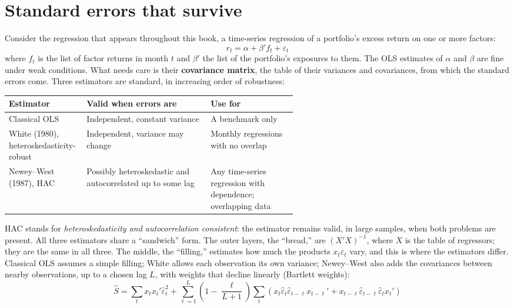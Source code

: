 \section{Standard errors that survive}
\label{sec:03-se}

Consider the regression that appears throughout this book, a time-series regression of a portfolio's excess return on one or more factors:
\begin{equation}
  r_t = \alpha + \beta' f_t + \varepsilon_t
  \label{eq:03-ts}
\end{equation}
where $f_t$ is the list of factor returns in month $t$ and $\beta'$ the list of the portfolio's exposures to them. The OLS estimates of $\alpha$ and $\beta$ are fine under weak conditions. What needs care is their \textbf{covariance matrix}, the table of their variances and covariances, from which the standard errors come. Three estimators are standard, in increasing order of robustness:

\begin{center}
\small
\begin{tabularx}{0.9\linewidth}{@{}>{\raggedright\arraybackslash}p{0.27\linewidth}>{\raggedright\arraybackslash}X>{\raggedright\arraybackslash}p{0.30\linewidth}@{}}
\toprule
Estimator & Valid when errors are & Use for \\
\midrule
Classical OLS & Independent, constant variance & A benchmark only \\
White (1980), heteroskedasticity-robust & Independent, variance may change & Monthly regressions with no overlap \\
Newey--West (1987), HAC & Possibly heteroskedastic and autocorrelated up to some lag & Any time-series regression with dependence; overlapping data \\
\bottomrule
\end{tabularx}
\end{center}

HAC stands for \emph{heteroskedasticity and autocorrelation consistent}: the estimator remains valid, in large samples, when both problems are present. All three estimators share a ``sandwich'' form. The outer layers, the ``bread,'' are $(X'X)^{-1}$, where $X$ is the table of regressors; they are the same in all three. The middle, the ``filling,'' estimates how much the products $x_t\varepsilon_t$ vary, and this is where the estimators differ. Classical OLS assumes a simple filling; White allows each observation its own variance; Newey--West also adds the covariances between nearby observations, up to a chosen lag $L$, with weights that decline linearly (Bartlett weights):
\begin{equation}
  \hat S = \sum_t x_t x_t' \hat\varepsilon_t^2 + \sum_{\ell=1}^{L} \left(1 - \frac{\ell}{L+1}\right) \sum_t \left(x_t \hat\varepsilon_t \hat\varepsilon_{t-\ell} x_{t-\ell}' + x_{t-\ell} \hat\varepsilon_{t-\ell} \hat\varepsilon_t x_t'\right)
  \label{eq:03-nw}
\end{equation}

